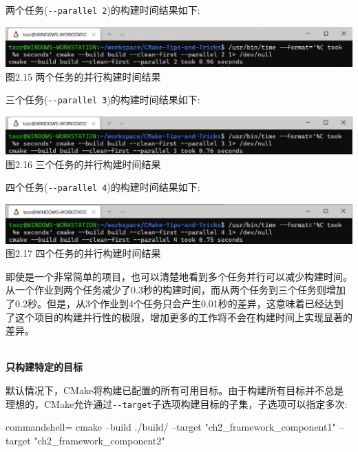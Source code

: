 两个任务(\texttt{-{}-parallel 2})的构建时间结果如下:

\begin{center}
\includegraphics[width=1.\textwidth]{content/1/chapter2/images/15.jpg}\\
图2.15 两个任务的并行构建时间结果
\end{center}

三个任务(\texttt{-{}-parallel 3})的构建时间结果如下:

\begin{center}
\includegraphics[width=1.\textwidth]{content/1/chapter2/images/16.jpg}\\
图2.16 三个任务的并行构建时间结果
\end{center}

四个任务(\texttt{-{}-parallel 4})的构建时间结果如下:

\begin{center}
\includegraphics[width=1.\textwidth]{content/1/chapter2/images/17.jpg}\\
图2.17 四个任务的并行构建时间结果
\end{center}

即使是一个非常简单的项目，也可以清楚地看到多个任务并行可以减少构建时间。从一个作业到两个任务减少了0.3秒的构建时间，而从两个任务到三个任务则增加了0.2秒。但是，从3个作业到4个任务只会产生0.01秒的差异，这意味着已经达到了这个项目的构建并行性的极限，增加更多的工作将不会在构建时间上实现显著的差异。

\hspace*{\fill} \\ %
\noindent
\textbf{只构建特定的目标}

默认情况下，CMake将构建已配置的所有可用目标。由于构建所有目标并不总是理想的，CMake允许通过\texttt{-{}-target}子选项构建目标的子集，子选项可以指定多次:

\begin{tcblisting}{commandshell={}}
cmake --build ./build/ --target "ch2_framework_component1"
--target "ch2_framework_component2"
\end{tcblisting}


